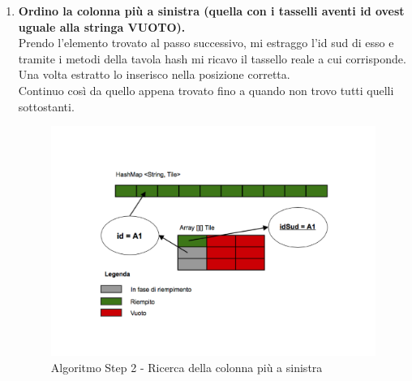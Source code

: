 \begin{enumerate}
		\item \textbf{Ordino la colonna più a sinistra (quella con i tasselli aventi id ovest uguale alla stringa VUOTO).} \\
		Prendo l'elemento trovato al passo successivo, mi estraggo l'id sud di esso e tramite i metodi della tavola hash mi ricavo il tassello reale a cui corrisponde. \\
		Una volta estratto lo inserisco nella posizione corretta. \\
		Continuo così da quello appena trovato fino a quando non trovo tutti quelli sottostanti.
		\begin{figure}[htbp]
			\centering
			\includegraphics[width=15cm]{img/algpuzzle_step2.pdf}
			\caption{Algoritmo Step 2 - Ricerca della colonna più a sinistra}
			\label{Algoritmo Step 2 - Ricerca della colonna più a sinistra}
		\end{figure}


\end{enumerate}
